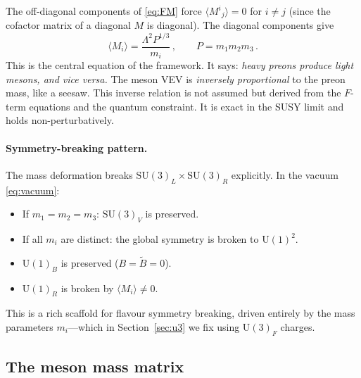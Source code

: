 \documentclass[12pt,a4paper]{article}
\newcommand{\SU}{\mathrm{SU}}
\newcommand{\UU}{\mathrm{U}}
\begin{document}
The off-diagonal components of \eqref{eq:FM} force
$\langle M^i{}_j \rangle = 0$ for $i \neq j$ (since the cofactor
matrix of a diagonal $M$ is diagonal). The diagonal components give
\begin{equation}
  \langle M_i \rangle = \frac{\Lambda^2 P^{1/3}}{m_i}\,,
  \qquad P = m_1 m_2 m_3\,.
  \label{eq:vacuum}
\end{equation}
This is the central equation of the framework. It says:
\emph{heavy preons produce light mesons, and vice versa.}
The meson VEV is \emph{inversely proportional} to the preon mass,
like a seesaw. This inverse relation is not assumed but derived
from the $F$-term equations and the quantum constraint.
It is exact in the SUSY limit and holds non-perturbatively.

\paragraph{Symmetry-breaking pattern.}
The mass deformation breaks $\SU(3)_L \times \SU(3)_R$ explicitly.
In the vacuum \eqref{eq:vacuum}:
\begin{itemize}
  \item If $m_1 = m_2 = m_3$: $\SU(3)_V$ is preserved.
  \item If all $m_i$ are distinct: the global symmetry is broken to
    $\UU(1)^2$.
  \item $\UU(1)_B$ is preserved ($B = \tilde{B} = 0$).
  \item $\UU(1)_R$ is broken by $\langle M_i \rangle \neq 0$.
\end{itemize}
This is a rich scaffold for flavour symmetry breaking, driven entirely
by the mass parameters $m_i$---which in Section~\ref{sec:u3} we fix
using $\UU(3)_F$ charges.

\subsection{The meson mass matrix}
\end{document}
